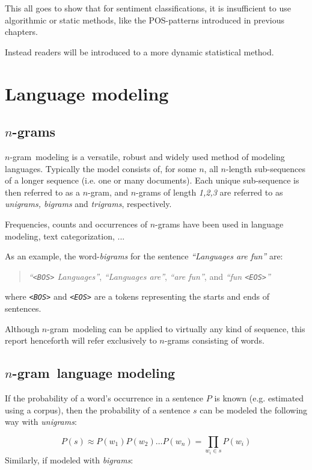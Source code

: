 \documentclass[a4paper,11pt]{kth-mag}
\newcommand{\todo}{ ... }
\newcommand{\ngram}{$n$-gram}
\begin{document}
This all goes to show that for sentiment classifications, it is insufficient
to use algorithmic or static methods, like the POS-patterns introduced in previous
chapters.

Instead readers will be introduced to a more dynamic statistical method.

\section{Language modeling}

\subsection{\ngram s}
\ngram~modeling is a versatile, robust and widely used method of modeling languages. Typically the model consists of, for some $n$, all $n$-length sub-sequences of a longer sequence (i.e. one or many documents). Each unique sub-sequence is then referred to as a \ngram, and \ngram s of length \emph{1,2,3} are referred to as \emph{unigrams, bigrams} and \emph{trigrams}, respectively\cite{ngrams}.

Frequencies, counts and occurrences of \ngram s have been used in language modeling\cite{chen_goodman}, text categorization\cite{ngrams}, \todo

As an example, the word-\emph{bigrams} for the sentence \emph{``Languages are fun''} are:
\begin{quote}
  \vspace*{0.1cm}
  \centering
\emph{``\texttt{<BOS>} Languages''}, \emph{``Languages are''}, \emph{``are fun''}, and \emph{``fun \texttt{<EOS>}''}
\end{quote}
where \emph{\texttt{<BOS>}} and \emph{\texttt{<EOS>}} are a tokens representing the starts and ends of sentences.

Although \ngram~modeling can be applied to virtually any kind of sequence, this report henceforth will refer exclusively to \ngram s consisting of words.

\subsection{\ngram~language modeling}
If the probability of a word's occurrence in a sentence $P$ is known (e.g. estimated using a corpus), then the probability of a sentence $s$ can be modeled the following way with \emph{unigrams}:

\begin{equation} \label{eq:unigram_chain_prob}
P(s) \approx P(w_1) P(w_2) \dots P(w_n) =\prod_{w_i \in s}P(w_i)
\end{equation}
Similarly, if modeled with \emph{bigrams}:
\end{document}
